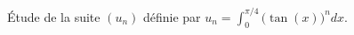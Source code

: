 
\begin{exercice}\label{exoTD6-0003}

	Étude de la suite $(u_n)$ définie par $u_n=\int_0^{\pi/4}\big( \tan(x) \big)^ndx$.

\end{exercice}
